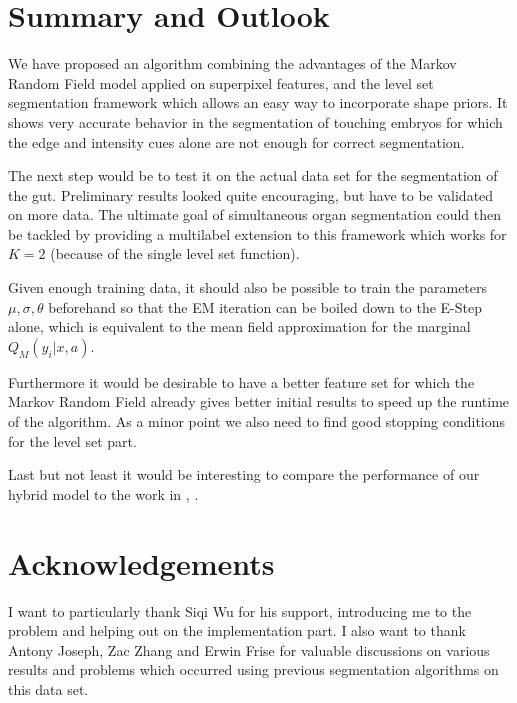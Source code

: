 \documentclass{article} %
\begin{document}
\section{Summary and Outlook}
We have proposed an algorithm combining the advantages of the Markov Random Field model applied on superpixel features, and the level set segmentation framework which allows an easy way to incorporate shape priors. It shows very accurate behavior in the segmentation of touching embryos for which the edge and intensity cues alone are not enough for correct segmentation. 

The next step would be to test it on the actual data set for the segmentation of the gut. Preliminary results looked quite encouraging, but have to be validated on more data. The ultimate goal of simultaneous organ segmentation could then be tackled by providing a multilabel extension to this framework which works for $K=2$ (because of the single level set function).

Given enough training data, it should also be possible to train the parameters $\mu, \sigma, \theta$  beforehand so that the EM iteration can be boiled down to the E-Step alone, which is equivalent to the mean field approximation for the marginal $Q_M(y_i|x,a)$.

Furthermore it would be desirable to have a better feature set for which the Markov Random Field already gives better initial results to speed up the runtime of the algorithm. As a minor point we also need to find good stopping conditions for the level set part.

Last but not least it would be interesting to compare the performance of our hybrid model to the work in \cite{Huang04_MRFDM}, \cite{Schlesinger13}.

\section{Acknowledgements}
I want to particularly thank Siqi Wu for his support, introducing me to the problem and helping out on the implementation part. I also want to thank Antony Joseph, Zac Zhang and Erwin Frise for valuable discussions on various results and problems which occurred using previous segmentation algorithms on this data set.

\FloatBarrier
\vskip 0.2in


\end{document}
